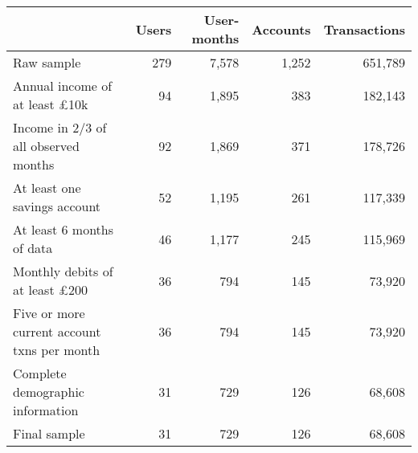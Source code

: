 \begin{tabular}{lrrrr}
\toprule
                                            & Users & User-months & Accounts & Transactions \\
\midrule
                                 Raw sample &   279 &       7,578 &    1,252 &      651,789 \\
       Annual income of at least \pounds10k &    94 &       1,895 &      383 &      182,143 \\
       Income in 2/3 of all observed months &    92 &       1,869 &      371 &      178,726 \\
               At least one savings account &    52 &       1,195 &      261 &      117,339 \\
                  At least 6 months of data &    46 &       1,177 &      245 &      115,969 \\
      Monthly debits of at least \pounds200 &    36 &         794 &      145 &       73,920 \\
Five or more current account txns per month &    36 &         794 &      145 &       73,920 \\
           Complete demographic information &    31 &         729 &      126 &       68,608 \\
                               Final sample &    31 &         729 &      126 &       68,608 \\
\bottomrule
\end{tabular}

